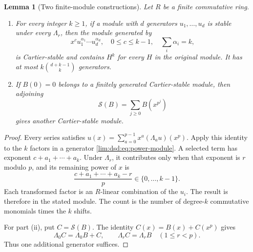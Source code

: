 \documentclass[11pt]{article}
\newtheorem{lemma}[theorem]{Lemma}
\theoremstyle{definition}
\theoremstyle{remark}
\begin{document}
\begin{lemma}[Two finite-module constructions]
\label{lim:dsd:lem:cartier-closure}
Let $R$ be a finite commutative ring.
\begin{enumerate}[label=\textup{(\roman*)}]
\item For every integer $k\ge1$, if a module with $d$ generators $u_1,\ldots,u_d$ is stable
under every $\Lambda_r$, then the module generated by
\begin{equation}
 x^c u_1^{\alpha_1}\cdots u_d^{\alpha_d},
 \quad 0\le c\le k-1,\quad \sum_i\alpha_i=k,
 \label{lim:dsd:eq:power-module}
\end{equation}
is Cartier-stable and contains $H^k$ for every $H$ in the original
module. It has at most $k\binom{d+k-1}{k}$ generators.
\item If $B(0)=0$ belongs to a finitely generated Cartier-stable
module, then adjoining
\begin{equation}
 \mathcal S(B)=\sum_{j\ge0}B(x^{p^j})
 \label{lim:dsd:eq:mahler-sum}
\end{equation}
gives another Cartier-stable module.
\end{enumerate}
\end{lemma}
\begin{proof}
Every series satisfies
$u(x)=\sum_{a=0}^{p-1}x^a(\Lambda_au)(x^p)$.
Apply this identity to the $k$ factors in a generator
\eqref{lim:dsd:eq:power-module}. A selected term has exponent
$c+a_1+\cdots+a_k$. Under $\Lambda_r$, it contributes only when
that exponent is $r$ modulo $p$, and its remaining power of $x$ is
\[
 \frac{c+a_1+\cdots+a_k-r}{p}\in\{0,\ldots,k-1\}.
\]
Each transformed factor is an $R$-linear combination of the $u_i$.
The result is therefore in the stated module. The count is the
number of degree-$k$ commutative monomials times the $k$ shifts.

For part (ii), put $C=\mathcal S(B)$. The identity
$C(x)=B(x)+C(x^p)$ gives
\begin{equation}
 \Lambda_0C=\Lambda_0B+C,\qquad
 \Lambda_rC=\Lambda_rB\quad(1\le r<p).
 \label{lim:dsd:eq:sum-transitions}
\end{equation}
Thus one additional generator suffices.
\end{proof}
\end{document}
